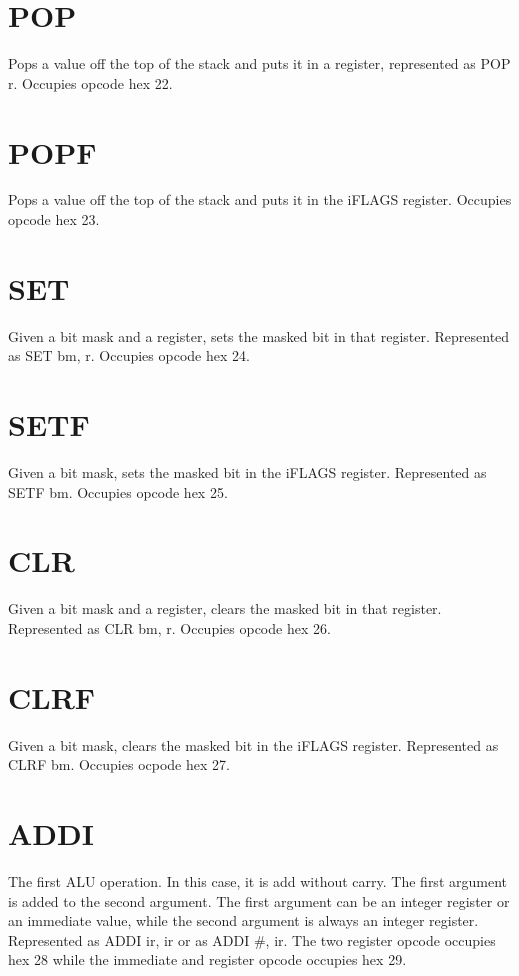 \documentclass[letterpaper,12pt]{book}
\begin{document}
\section{POP}

Pops a value off the top of the stack and puts it in a register, represented as POP r. Occupies opcode hex 22.

\section{POPF}

Pops a value off the top of the stack and puts it in the iFLAGS register. Occupies opcode hex 23.

\section{SET}

Given a bit mask and a register, sets the masked bit in that register. Represented as SET bm, r. Occupies opcode hex 24.

\section{SETF}

Given a bit mask, sets the masked bit in the iFLAGS register. Represented as SETF bm. Occupies opcode hex 25.

\section{CLR}

Given a bit mask and a register, clears the masked bit in that register. Represented as CLR bm, r. Occupies opcode hex 26.

\section{CLRF}

Given a bit mask, clears the masked bit in the iFLAGS register. Represented as CLRF bm. Occupies ocpode hex 27.

\section{ADDI}

The first ALU operation. In this case, it is add without carry. The first argument is added to the second argument. The first argument can be an integer register or an immediate value, while the second argument is always an integer register. Represented as ADDI ir, ir or as ADDI \#, ir. The two register opcode occupies hex 28 while the immediate and register opcode occupies hex 29.
\end{document}
